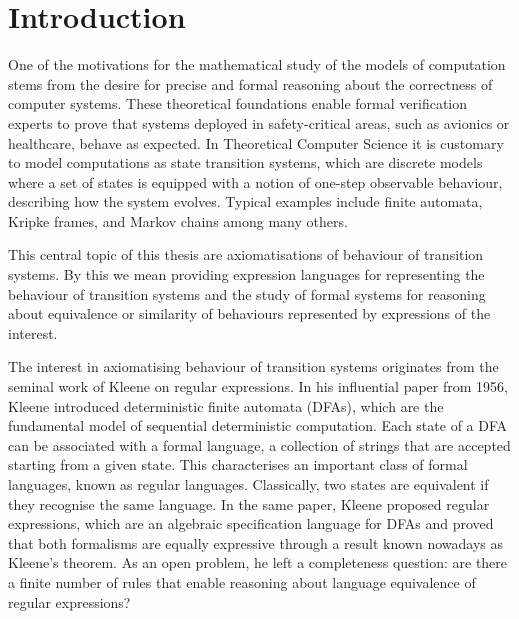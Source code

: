 \chapter{Introduction}
\label{chapter:introduction}
One of the motivations for the mathematical study of the models of computation stems from the desire for precise and formal reasoning about the correctness of computer systems. These theoretical foundations enable formal verification experts to prove that systems deployed in safety-critical areas, such as avionics or healthcare, behave as expected. In Theoretical Computer Science it is customary to model computations as state transition systems, which are discrete models where a set of states is equipped with a notion of one-step observable behaviour, describing how the system evolves. Typical examples include finite automata, Kripke frames, and Markov chains among many others. 

	This central topic of this thesis are axiomatisations of behaviour of transition systems. By this we mean providing expression languages for representing the behaviour of transition systems and the study of formal systems for reasoning about equivalence or similarity of behaviours represented by expressions of the interest. 
	
	The interest in axiomatising behaviour of transition systems originates from the seminal work of Kleene on regular expressions.  In his influential paper from 1956, Kleene introduced deterministic finite automata (DFAs), which are the fundamental model of sequential deterministic computation. Each state of a DFA can be associated with a formal language, a collection of strings that are accepted starting from a given state. This characterises an important class of formal languages, known as regular languages. Classically, two states are equivalent if they recognise the same language. In the same paper, Kleene proposed regular expressions, which are an algebraic specification language for DFAs and proved that both formalisms are equally expressive through a result known nowadays as Kleene’s theorem. As an open problem, he left a completeness question: are there a finite number of rules that enable reasoning about language equivalence of regular expressions? 

